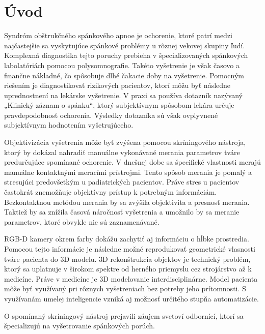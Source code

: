 
\setcounter{page}{1} %
\chapter{Úvod} \label{kap:Uvod}

\pagestyle{fancy}
\fancyhf{}
\fancyfoot[CE,CO]{\thepage}
\renewcommand{\footrulewidth}{1pt}

Syndróm obštrukčného spánkového apnoe je ochorenie, ktoré patrí medzi najčastejšie sa
vyskytujúce spánkové problémy u rôznej vekovej skupiny ľudí. Komplexná diagnostika tejto
poruchy prebieha v špecializovaných spánkových labolatóriách pomocou polysomnografie.
Takéto vyšetrenie je však časovo a finančne nákladné, čo spôsobuje dlhé čakacie doby na
vyšetrenie. Pomocným riešením je diagnostikovať rizikových pacientov, ktorí môžu byť následne
uprednostnení na lekárske vyšetrenie. V praxi sa používa dotazník nazývaný „Klinický záznam
o spánku“, ktorý subjektívnym spôsobom lekára určuje pravdepodobnosť ochorenia. Výsledky
dotazníka sú však ovplyvnené subjektívnym hodnotením vyšetrujúceho.

Objektivizácia vyšetrenia môže byť zvýšena pomocou skríningového nástroja, ktorý by dokázal
nahradiť manuálne vykonávané merania parametrov tváre predurčujúce spomínané ochorenie.
V dnešnej dobe sa špecifické vlastnosti merajú manuálne kontaktnými meracími prístrojmi. Tento
spôsob merania je pomalý a stresujúci predovšetkým u padiatrických pacientov. Práve stres
u pacientov častokrát znemožňuje objektívny prístup k potrebným informáciám. Bezkontaktnou
metódou merania by sa zvýšila objektivita a presnosť merania. Taktiež by sa znížila časová
náročnosť vyšetrenia a umožnilo by sa meranie parametrov, ktoré obvykle nie sú zaznamenávané.

RGB-D kamery okrem farby dokážu zachytiť aj informáciu o hĺbke prostredia. Pomocou tejto
informácie je následne možné reprodukovať geometrické vlasnosti tváre pacienta do 3D modelu.
3D rekonštrukcia objektov je technický problém, ktorý sa uplatnuje v širokom spektre od herného
priemyslu cez strojárstvo až k medicíne. Práve v medicíne je 3D modelovanie interdisciplinárne.
Model pacienta môže byť využívaný pri rôznych vyšetreniach bez potreby jeho prítomnosti.
S využívanám umelej inteligencie vzniká aj možnosť určitého stupňa automatizácie.

O spomínaný skríningový nástroj prejavili záujem svetoví odbornící, ktorí sa špecializujú na vyšetrovanie spánkových porúch.



